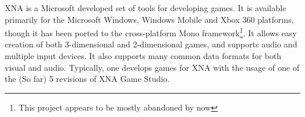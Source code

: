 XNA is a Microsoft developed set of tools for developing games\cite{XNADEV}. It is available
primarily for the Microsoft Windows, Windows Mobile and Xbox 360 platforms, though
it has been ported to the cross-platform Mono framework\footnote{This project
appears to be mostly abandoned by now}.
It allows easy creation of both 3-dimensional and 2-dimensional games,
and supports audio and multiple input devices. It also supports many common data
formats for both visual and audio. Typically, one develops games for XNA with the
usage of one of the (So far) 5 revisions of XNA Game Studio.

